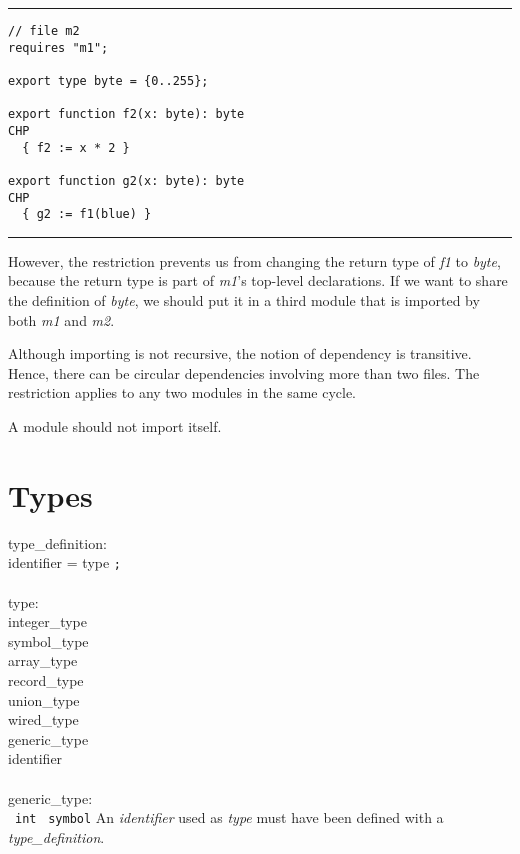 \medskip
\hrule
\begin{verbatim}
// file m2
requires "m1";

export type byte = {0..255};

export function f2(x: byte): byte
CHP
  { f2 := x * 2 }

export function g2(x: byte): byte
CHP
  { g2 := f1(blue) }
\end{verbatim}
\hrule
\medskip

However, the restriction prevents us from changing the return type of {\it{}f1}
to {\it{}byte}, because the return type is part of {\it{}m1}'s top-level declarations.
If we want to share the definition of {\it{}byte}, we should put it in a third
module that is imported by both {\it{}m1} and {\it{}m2}.
    
Although importing is not recursive, the notion of dependency is
transitive. Hence, there can be circular dependencies involving more than
two files. The restriction applies to any two modules in the same cycle.

A module should not import itself.



\section{Types}\label{sec:types}

\grammarstart
type\_definition: \\
       identifier = type {\tt{};} \\
 \\
type: \\
       \>integer\_type \\
\orbox \>symbol\_type \\
\orbox \>array\_type \\
\orbox \>record\_type \\
\orbox \>union\_type \\
\orbox \>wired\_type \\
\orbox \>generic\_type \\
\orbox \>identifier \\
 \\
generic\_type: \\
       \orbox \ {\tt{}int} \orbox \ {\tt{}symbol}
\grammarend
An {\it{}identifier} used as {\it{}type} must have been defined with a
{\it{}type\_definition}.

